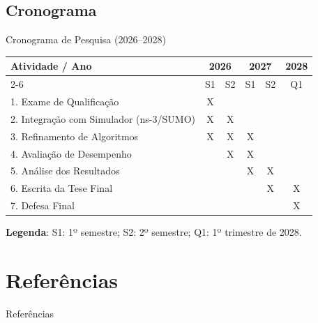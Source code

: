 \documentclass[aspectratio=169]{beamer}
\begin{document}
\subsection{Cronograma}
\begin{frame}{Cronograma de Pesquisa (2026--2028)}
    \centering
    \scriptsize
    \renewcommand{\arraystretch}{1.2}
    \begin{tabular}{|l|c|c|c|c|c|} 
        \hline
        \textbf{Atividade / Ano} & \multicolumn{2}{c|}{\textbf{2026}} & \multicolumn{2}{c|}{\textbf{2027}} & \textbf{2028} \\ \cline{2-6}
        & S1 & S2 & S1 & S2 & Q1 \\ \hline
        1. Exame de Qualificação            & \cellcolor{blue!15}X &   &   &   &   \\ \hline
        2. Integração com Simulador (ns-3/SUMO) & \cellcolor{blue!15}X & \cellcolor{blue!15}X &   &   &   \\ \hline
        3. Refinamento de Algoritmos        & \cellcolor{blue!15}X & \cellcolor{blue!15}X & \cellcolor{blue!15}X &   &   \\ \hline
        4. Avaliação de Desempenho          &   & \cellcolor{blue!15}X & \cellcolor{blue!15}X &   &   \\ \hline
        5. Análise dos Resultados           &   &   & \cellcolor{blue!15}X & \cellcolor{blue!15}X &   \\ \hline
        6. Escrita da Tese Final            &   &   &   & \cellcolor{blue!15}X & \cellcolor{blue!15}X \\ \hline
        7. Defesa Final                     &   &   &   &   & \cellcolor{blue!15}X \\ \hline
    \end{tabular} 
    
    \vspace{0.4cm}
    \tiny \textbf{Legenda}: S1: 1º semestre; S2: 2º semestre; Q1: 1º trimestre de 2028.
\end{frame}

\section{Referências}
\begin{frame}[allowframebreaks]{Referências}


\end{frame}


\begin{frame}
    \maketitle
\end{frame}
\end{document}

